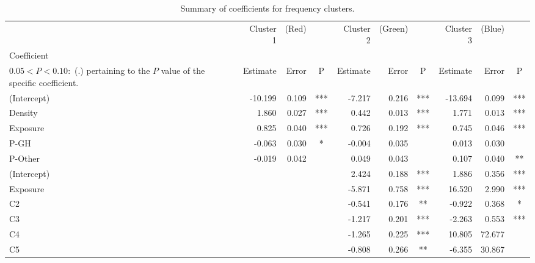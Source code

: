 \documentclass[11pt,letterpaper]{article}
\numberwithin{equation}{section}
\numberwithin{equation}{section}
\numberwithin{equation}{section}
\begin{document}
\begin{center}
\begin{table}
\caption{Summary of coefficients for frequency clusters.}
\label{frequencySummary}
\begin{tabular}{|l|rrc|rrc|rrc|}
\hline\hline
          & Cluster 1 & (Red) &   & Cluster 2 & (Green) &  & Cluster 3 & (Blue) &   \\
Coefficient \footnote{The significance codes are defined as $  P < 0.001 : $  (***), $0.001 < P < 0.01:$ (**), $  0.01 < P < 0.05:$ (*),\\ $0.05 < P < 0.10 : $ (.) %
pertaining to the $P$ value of the specific coefficient.}             & Estimate  & Error & P   & Estimate  & Error   & P   & Estimate  & Error  & P  \\
 \hline
(Intercept) & -10.199   & 0.109 & *** & -7.217    & 0.216   & *** & -13.694   & 0.099  & *** \\
Density     & 1.860     & 0.027 & *** & 0.442     & 0.013   & *** & 1.771     & 0.013  & *** \\
Exposure    & 0.825     & 0.040 & *** & 0.726     & 0.192   & *** & 0.745     & 0.046  & *** \\
P-GH        & -0.063    & 0.030 & *   & -0.004    & 0.035   &     & 0.013     & 0.030  &     \\
P-Other     & -0.019    & 0.042 &     & 0.049     & 0.043   &     & 0.107     & 0.040  & **  \\
\hline
(Intercept) &          &      &    & 2.424     & 0.188   & *** & 1.886     & 0.356  & *** \\
Exposure    &          &      &    & -5.871    & 0.758   & *** & 16.520    & 2.990  & *** \\
C2          &          &      &    & -0.541    & 0.176   & **  & -0.922    & 0.368  & *   \\
C3          &          &      &    & -1.217    & 0.201   & *** & -2.263    & 0.553  & *** \\
C4          &          &      &    & -1.265    & 0.225   & *** & 10.805    & 72.677 &     \\
C5          &          &      &    & -0.808    & 0.266   & **  & -6.355    & 30.867 &   \\
\hline\hline
\end{tabular}
\end{table}
\end{center}

\newpage


\end{document}
